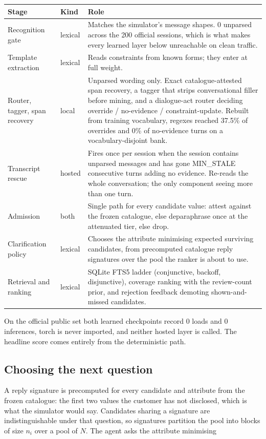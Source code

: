 \documentclass[11pt,a4paper]{article}
\begin{document}
\begin{center}\small
\begin{tabular}{@{}>{\RaggedRight\arraybackslash}p{}>{\RaggedRight\arraybackslash}p{}>{\RaggedRight\arraybackslash}p{}@{}}
\toprule \textbf{Stage} & \textbf{Kind} & \textbf{Role} \\ \midrule
Recognition gate & lexical & Matches the simulator's message shapes. 0 unparsed across the 200 official sessions, which is what makes every learned layer below unreachable on clean traffic. \\[1.5pt]
Template extraction & lexical & Reads constraints from known forms; they enter at full weight. \\[1.5pt]
Router, tagger, span recovery & local & Unparsed wording only. Exact catalogue-attested span recovery, a tagger that strips conversational filler before mining, and a dialogue-act router deciding override / no-evidence / constraint-update. Rebuilt from training vocabulary, regexes reached 37.5\% of overrides and 0\% of no-evidence turns on a vocabulary-disjoint bank. \\[1.5pt]
Transcript rescue & hosted & Fires once per session when the session contains unparsed messages and has gone MIN\_STALE consecutive turns adding no evidence. Re-reads the whole conversation; the only component seeing more than one turn. \\[1.5pt]
Admission & both & Single path for every candidate value: attest against the frozen catalogue, else deparaphrase once at the attenuated tier, else drop. \\[1.5pt]
Clarification policy & lexical & Chooses the attribute minimising expected surviving candidates, from precomputed catalogue reply signatures over the pool the ranker is about to use. \\[1.5pt]
Retrieval and ranking & lexical & SQLite FTS5 ladder (conjunctive, backoff, disjunctive), coverage ranking with the review-count prior, and rejection feedback demoting shown-and-missed candidates. \\[1.5pt]
\bottomrule\end{tabular}\end{center}
On the official public set both learned checkpoints record 0 loads and 0 inferences, torch is never imported, and neither hosted layer is called. The headline score comes entirely from the deterministic path.

\subsection*{Choosing the next question}
A reply signature is precomputed for every candidate and attribute from the frozen catalogue: the first two values the customer has not disclosed, which is what the simulator would say. Candidates sharing a signature are indistinguishable under that question, so signatures partition the pool into blocks of size $n_i$ over a pool of $N$. The agent asks the attribute minimising
\end{document}

